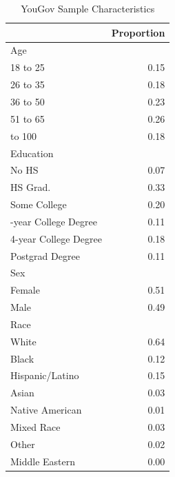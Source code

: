 \begin{table}

\caption{\label{tab:yg_dat}YouGov Sample Characteristics}
\centering
\begin{tabular}[t]{lr}
\toprule
 & Proportion\\
\midrule
Age & \\
18 to 25 & 0.15\\
26 to 35 & 0.18\\
36 to 50 & 0.23\\
51 to 65 & 0.26\\
\addlinespace
66 to 100 & 0.18\\
Education & \\
No HS & 0.07\\
HS Grad. & 0.33\\
Some College & 0.20\\
\addlinespace
2-year College Degree & 0.11\\
4-year College Degree & 0.18\\
Postgrad Degree & 0.11\\
Sex & \\
Female & 0.51\\
\addlinespace
Male & 0.49\\
Race & \\
White & 0.64\\
Black & 0.12\\
Hispanic/Latino & 0.15\\
\addlinespace
Asian & 0.03\\
Native American & 0.01\\
Mixed Race & 0.03\\
Other & 0.02\\
Middle Eastern & 0.00\\
\bottomrule
\end{tabular}
\end{table}
